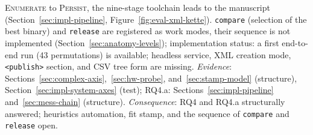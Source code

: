 \begin{nurkurz}
\textsc{Enumerate} to \textsc{Persist}, the nine-stage toolchain leads to the manuscript
(Section~\ref{sec:impl-pipeline}, Figure~\ref{fig:eval-xml-kette}). \texttt{compare} (selection of the
best binary) and \texttt{release} are registered as work modes, their sequence is not implemented
(Section~\ref{sec:anatomy-levels}); implementation status: a first end-to-end run (43 permutations) is
available; headless service, XML creation mode, \texttt{<publish>} section, and CSV tree form are missing.
\emph{Evidence}: Sections~\ref{sec:complex-axis},~\ref{sec:hw-probe}, and~\ref{sec:stamp-model}
(structure), Section~\ref{sec:impl-system-axes} (test); RQ4.a: Sections~\ref{sec:impl-pipeline}
and~\ref{sec:mess-chain} (structure).
\emph{Consequence}: RQ4 and RQ4.a structurally answered; heuristics
automation, fit stamp, and the sequence of \texttt{compare} and \texttt{release} open.
\end{nurkurz}

